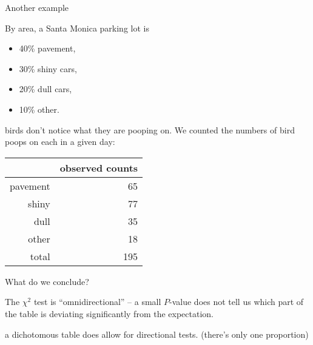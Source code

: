 \begin{frame}{Another example}

    By area, a Santa Monica parking lot is
    \begin{itemize}
        \item 40\% pavement,
        \item 30\% shiny cars,
        \item 20\% dull cars,
        \item 10\% other.
    \end{itemize}
    
    \vspace{2em}

     birds don't notice what they are pooping on.
    We counted the numbers of bird poops on each in a given day:
    \begin{center}
        \begin{tabular}{rr}
            & observed counts \\
            \hline 
            pavement & 65 \\
            shiny & 77 \\
            dull & 35 \\
            other & 18 \\
            \hline
            total & 195
        \end{tabular}
    \end{center}

\end{frame}



\begin{frame}{What do we conclude?}

    The $\chi^2$ test is ``omnidirectional'' --
    a small $P$-value does not tell us \alert{which part} of the table
    is deviating significantly from the expectation.

    \vspace{2em}

     a \alert{dichotomous} table does allow for directional tests.
    (there's only one proportion)


\end{frame}


